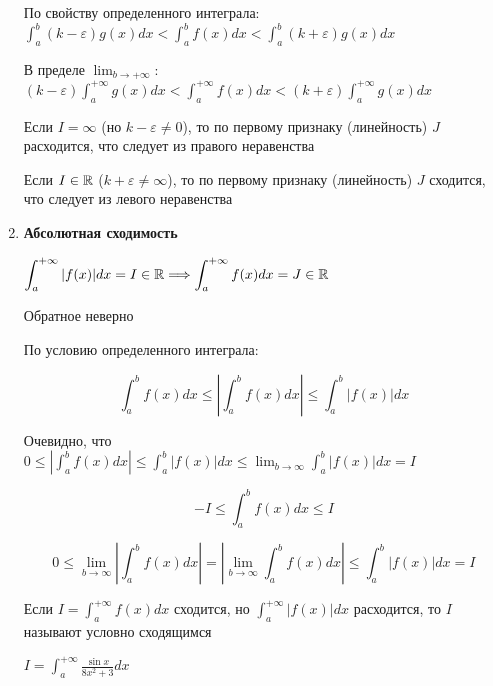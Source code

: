 \documentclass[12pt]{article}
\begin{document}
\begin{enumerate}[label*=\textbf{\arabic** }]
\begin{MyProof}
            По свойству определенного интеграла: $\displaystyle \int^{b}_{a} (k - \varepsilon)g(x) dx < \int^{b}_{a} f(x) dx < \int^{b}_{a} (k + \varepsilon)g(x) dx$

            В пределе $\displaystyle \lim_{b \to +\infty}$: $\displaystyle (k - \varepsilon) \int^{+\infty}_{a} g(x) dx < \int^{+\infty}_{a} f(x) dx < (k + \varepsilon) \int^{+\infty}_{a} g(x) dx$

            Если $I = \infty$ (но $k - \varepsilon \neq 0$), то по первому признаку (линейность) $J$ расходится, что следует из правого неравенства

            Если $I \in \mathbb{R}$ ($k + \varepsilon \neq \infty$), то по первому признаку (линейность) $J$ сходится, что следует из левого неравенства
        \end{MyProof}

        \hypertarget{improperintegralabsoluteconvergence}{}
        \item \textbf{Абсолютная сходимость}

        \begin{MyTheorem}
            $\displaystyle \int^{+\infty}_{a} |f(x)| dx = I \in \mathbb{R} \Longrightarrow \int^{+\infty}_{a} f(x) dx = J \in \mathbb{R}$
        \end{MyTheorem}

        \Nota Обратное неверно

        \begin{MyProof}
            По условию определенного интеграла:

            \[\int^{b}_{a} f(x) dx \leq \left|\int^{b}_{a} f(x) dx\right| \leq \int^{b}_{a} |f(x)| dx\]

            Очевидно, что $\displaystyle 0 \leq \left|\int^{b}_{a} f(x) dx\right| \leq \int^{b}_{a} |f(x)| dx \leq \lim_{b \to \infty} \int^{b}_{a} |f(x)| dx = I$

            \[-I \leq \int^{b}_{a} f(x) dx \leq I\]

            \[0 \leq \lim_{b \to \infty} \left|\int^{b}_{a} f(x) dx\right| = \left|\lim_{b \to \infty} \int^{b}_{a} f(x) dx\right| \leq \int^{b}_{a} |f(x)| dx = I\]
        \end{MyProof}

        \Nota \hypertarget{improperintegralconditionalconvergence}{}Если $\displaystyle I = \int^{+\infty}_{a} f(x) dx$ сходится, но $\displaystyle \int^{+\infty}_{a} |f(x)| dx$ расходится, то $I$ называют условно сходящимся

        \Ex $\displaystyle I = \int^{+\infty}_{a} \frac{\sin x}{8x^2 + 3} dx$


\end{enumerate}
\end{document}
